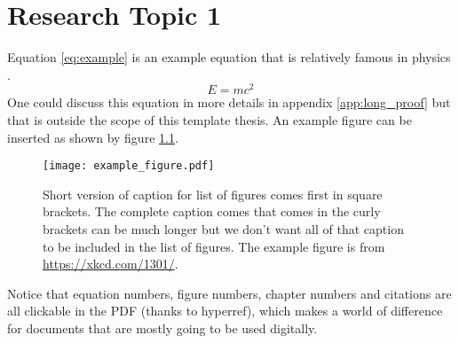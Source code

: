 \chapter{Research Topic 1}
\label{cha:research_topic_1}

Equation \ref{eq:example} is an example equation that is relatively famous in physics
\cite{einstein_ist_1905}. 
\begin{equation}
    \label{eq:example}
    E = m c^2
\end{equation}
One could discuss this equation in more details in appendix \ref{app:long_proof}
but that is outside the scope of this template thesis. 
An example figure can be inserted as shown by figure \ref{fig:example_figure}.

\begin{figure}[tbh]
  \centering
  \texttt{[image: example\_figure.pdf]}
  \caption[Short version of caption for list of figures comes first in brackets.]{
    Short version of caption for list of figures comes first in square brackets.
    The complete caption comes that comes in the curly brackets can be much longer
    but we don't want all of that caption to be included in the list of figures. 
    The example figure is from \url{https://xkcd.com/1301/}.
  }
  \label{fig:example_figure}
\end{figure}

Notice that equation numbers, figure numbers, chapter numbers and citations
are all clickable in the PDF (thanks to hyperref),
which makes a world of difference for documents that are mostly going to be used digitally.

\paragraph{}
\Blindtext[2]
